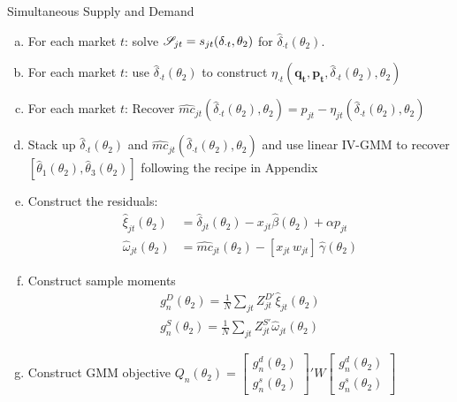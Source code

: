 \documentclass[aspectratio=169,11pt]{beamer}
\begin{document}
\begin{frame}{Simultaneous Supply and Demand}
\tiny
\begin{enumerate}[(a)]
\item For each market $t$: solve $\mathscr{S}_{jt} = s_{jt}(\delta_{\cdot t},\theta_2)$ for $\widehat{\delta}_{\cdot t}(\theta_2)$.
\item For each market $t$: use $\widehat{\delta}_{\cdot t}(\theta_2)$ to construct $\eta_{\cdot 
t}(\symbf{q_t},\symbf{p_t},\widehat{\delta}_{\cdot t}(\theta_2),\theta_2)$
\item For each market $t$: Recover $\widehat{mc}_{jt}(\widehat{\delta}_{\cdot t}(\theta_2),\theta_2) = p_{jt} - \eta_{jt}(\widehat{\delta}_{\cdot t}(\theta_2),\theta_2)$
\item Stack up $\widehat{\delta}_{\cdot t}(\theta_2)$ and $\widehat{mc}_{jt}(\widehat{\delta}_{\cdot t}(\theta_2),\theta_2)$ and use linear IV-GMM to recover $[\widehat{\theta}_1(\theta_2), \widehat{\theta}_3(\theta_2) ]$ following the recipe in Appendix
\item Construct the residuals:
\begin{align*}
\nonumber    \widehat{\xi}_{jt}(\theta_2) &= \widehat{\delta}_{jt}(\theta_2) -  x_{jt} \widehat{\beta}(\theta_2) + \alpha p_{jt}\\
    \widehat{\omega}_{jt}(\theta_2) &= \widehat{mc}_{jt}(\theta_2) -  [x_{jt}\, w_{jt}]\, \widehat{\gamma}(\theta_2)
\end{align*}
\item Construct sample moments
\begin{align*}
\nonumber g_n^D(\theta_2)=\frac{1}{N} \sum_{jt} Z_{jt}^{D\prime} \widehat{\xi}_{jt}(\theta_2)\\
 g_n^S(\theta_2)=\frac{1}{N} \sum_{jt} Z_{jt}^{S \prime} \widehat{\omega}_{jt}(\theta_2)
\end{align*}
\item Construct GMM objective $Q_n(\theta_2)= \left[ {\begin{array}{c} g_n^d(\theta_2) \\ g_n^s(\theta_2) \end{array} } \right]' W  \left[ {\begin{array}{c} g_n^d(\theta_2) \\ g_n^s(\theta_2) \end{array} } \right] $
\end{enumerate}
\end{frame}
\end{document}

